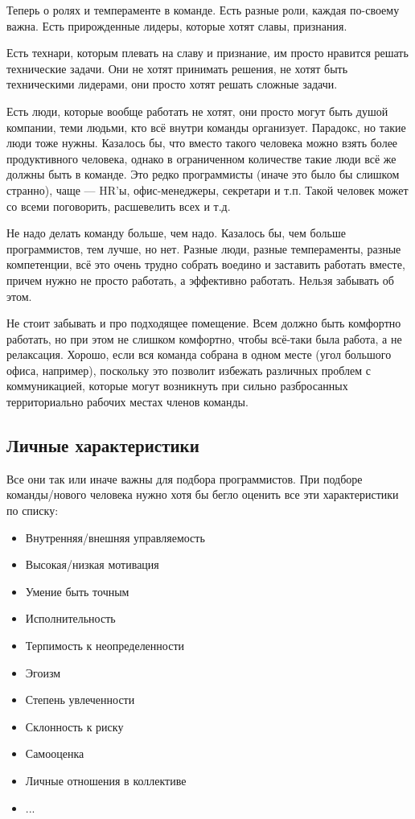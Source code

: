 \documentclass{../../text-style}
\begin{document}
Теперь о ролях и темпераменте в команде. Есть разные роли, каждая по-своему важна. Есть прирожденные лидеры, которые хотят славы, признания.

Есть технари, которым плевать на славу и признание, им просто нравится решать технические задачи. Они не хотят принимать решения, не хотят быть техническими лидерами, они просто хотят решать сложные задачи.

Есть люди, которые вообще работать не хотят, они просто могут быть душой компании, теми людьми, кто всё внутри команды организует. Парадокс, но такие люди тоже нужны. Казалось бы, что вместо такого человека можно взять более продуктивного человека, однако в ограниченном количестве такие люди всё же должны быть в команде. Это редко программисты (иначе это было бы слишком странно), чаще --- HR’ы, офис-менеджеры, секретари и т.п. Такой человек может со всеми поговорить, расшевелить всех и т.д.

Не надо делать команду больше, чем надо. Казалось бы, чем больше программистов, тем лучше, но нет. Разные люди, разные темпераменты, разные компетенции, всё это очень трудно собрать воедино и заставить работать вместе, причем нужно не просто работать, а эффективно работать. Нельзя забывать об этом.

Не стоит забывать и про подходящее помещение. Всем должно быть комфортно работать, но при этом не слишком комфортно, чтобы всё-таки была работа, а не релаксация. Хорошо, если вся команда собрана в одном месте (угол большого офиса, например), поскольку это позволит избежать различных проблем с коммуникацией, которые могут возникнуть при сильно разбросанных территориально рабочих местах членов команды.

\subsection{Личные характеристики}

Все они так или иначе важны для подбора программистов. При подборе команды/нового человека нужно хотя бы бегло оценить все эти характеристики по списку:

\begin{itemize}
    \item Внутренняя/внешняя управляемость
    \item Высокая/низкая мотивация
    \item Умение быть точным
    \item Исполнительность
    \item Терпимость к неопределенности
    \item Эгоизм
    \item Степень увлеченности
    \item Склонность к риску
    \item Самооценка
    \item Личные отношения в коллективе
    \item ...
\end{itemize}
\end{document}
